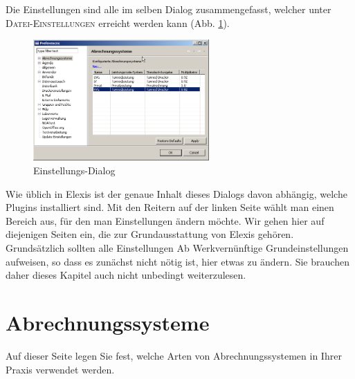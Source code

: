 %

\label{settings}
Die Einstellungen sind alle im selben Dialog zusammengefasst, welcher unter
\textsc{Datei-Einstellungen} erreicht werden kann (Abb. \ref{fig:settingsmain}).
\begin{figure}[h]
\begin{center}
  \includegraphics[width=0.6\textwidth]{images/settingsmain}
  \caption{Einstellungs-Dialog}
  \label{fig:settingsmain}
\end{center}
\end{figure}


Wie üblich in Elexis ist der genaue Inhalt dieses Dialogs davon abhängig,
welche Plugins installiert sind. Mit den Reitern auf der linken Seite wählt man
einen Bereich aus, für den man Einstellungen ändern möchte. Wir gehen hier auf
diejenigen Seiten ein, die zur Grundausstattung von Elexis gehören. Grundsätzlich
sollten alle Einstellungen \glqq Ab Werk\grqq{}vernünftige Grundeinstellungen
aufweisen, so dass es zunächst nicht nötig ist, hier etwas zu ändern. Sie
brauchen daher dieses Kapitel auch nicht unbedingt weiterzulesen.

\section{Abrechnungssysteme}
\label{settings:abrechnungssystem}
Auf dieser Seite legen Sie fest, welche Arten von Abrechnungssystemen in Ihrer Praxis verwendet werden. 


